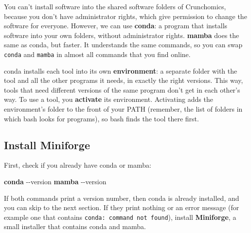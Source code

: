 \documentclass[
  letterpaper,
  DIV=11,
  numbers=noendperiod]{scrreprt}
\newenvironment{Shaded}{}{}
\newcommand{\AttributeTok}[1]{\textcolor[rgb]{0.84,0.23,0.29}{#1}}
\newcommand{\ExtensionTok}[1]{\textcolor[rgb]{0.84,0.23,0.29}{\textbf{#1}}}
\begin{document}
You can't install software into the shared software folders of
Crunchomics, because you don't have administrator rights, which give
permission to change the software for everyone. However, we can use
\textbf{conda}: a program that installs software into your own folders,
without administrator rights. \textbf{mamba} does the same as conda, but
faster. It understands the same commands, so you can swap \texttt{conda}
and \texttt{mamba} in almost all commands that you find online.

conda installs each tool into its own \textbf{environment}: a separate
folder with the tool and all the other programs it needs, in exactly the
right versions. This way, tools that need different versions of the same
program don't get in each other's way. To use a tool, you
\textbf{activate} its environment. Activating adds the environment's
folder to the front of your PATH (remember, the list of folders in which
bash looks for programs), so bash finds the tool there first.

\subsection{Install Miniforge}\label{install-miniforge}

First, check if you already have conda or mamba:

\begin{Shaded}
\begin{Highlighting}[]
\ExtensionTok{conda} \AttributeTok{{-}{-}version}
\ExtensionTok{mamba} \AttributeTok{{-}{-}version}
\end{Highlighting}
\end{Shaded}

If both commands print a version number, then conda is already
installed, and you can skip to the next section. If they print nothing
or an error message (for example one that contains
\texttt{conda:\ command\ not\ found}), install \textbf{Miniforge}, a
small installer that contains conda and mamba.
\end{document}
